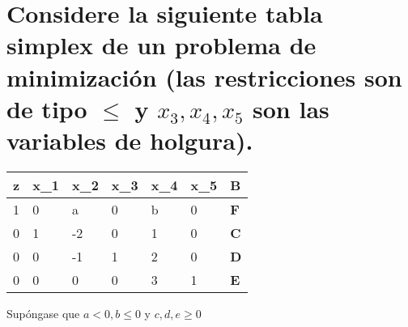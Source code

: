 \section{Considere la siguiente tabla simplex de un problema de minimización (las restricciones son de tipo $\leq$ y $x_3, x_4, x_5$ son las variables de holgura).}
\begin{center}
\begin{tabular}{lllllll}
z                       & x\_1                   & x\_2                    & x\_3                   & x\_4                   & x\_5                   & \textbf{B}                      \\ \hline
\multicolumn{1}{|l|}{1} & \multicolumn{1}{l|}{0} & \multicolumn{1}{l|}{a}  & \multicolumn{1}{l|}{0} & \multicolumn{1}{l|}{b} & \multicolumn{1}{l|}{0} & \multicolumn{1}{l|}{\textbf{F}} \\ \hline
\multicolumn{1}{|l|}{0} & \multicolumn{1}{l|}{1} & \multicolumn{1}{l|}{-2} & \multicolumn{1}{l|}{0} & \multicolumn{1}{l|}{1} & \multicolumn{1}{l|}{0} & \multicolumn{1}{l|}{\textbf{C}} \\ \hline
\multicolumn{1}{|l|}{0} & \multicolumn{1}{l|}{0} & \multicolumn{1}{l|}{-1} & \multicolumn{1}{l|}{1} & \multicolumn{1}{l|}{2} & \multicolumn{1}{l|}{0} & \multicolumn{1}{l|}{\textbf{D}} \\ \hline
\multicolumn{1}{|l|}{0} & \multicolumn{1}{l|}{0} & \multicolumn{1}{l|}{0}  & \multicolumn{1}{l|}{0} & \multicolumn{1}{l|}{3} & \multicolumn{1}{l|}{1} & \multicolumn{1}{l|}{\textbf{E}} \\ \hline
\end{tabular}
\end{center}

Supóngase que $a<0, b\leq 0$ y $c,d,e \geq 0$

